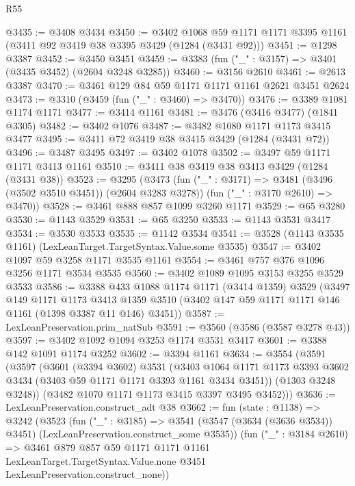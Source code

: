 \begin{lexlean}{R55}
\begin{coremodule}
@3435 := @3408 @3434
@3450 := @3402
    @1068
    @59
    @1171
    @1171
    @3395
    @1161
    (@3411 @92 @3419 @38 @3395 @3429 (@1284 (@3431 @92)))
@3451 := @1298 @3387
@3452 := @3450 @3451
@3459 := @3383 (fun ("_" : @3157) => @3401 (@3435 @3452) (@2604 @3248 @3285))
@3460 := @3156 @2610
@3461 := @2613 @3387
@3470 := @3461 @129 @84 @59 @1171 @1171 @1161 @2621 @3451 @2624
@3473 := @3310 (@3459 (fun ("_" : @3460) => @3470))
@3476 := @3389 @1081 @1174 @1171
@3477 := @3414 @1161
@3481 := @3476 (@3416 @3477) (@1841 @3305)
@3482 := @3402 @1076
@3487 := @3482 @1080 @1171 @1173 @3415 @3477
@3495 := @3411 @72 @3419 @38 @3415 @3429 (@1284 (@3431 @72))
@3496 := @3487 @3495
@3497 := @3402 @1078
@3502 := @3497 @59 @1171 @1171 @3413 @1161
@3510 := @3411 @38 @3419 @38 @3413 @3429 (@1284 (@3431 @38))
@3523 := @3295
    (@3473
      (fun ("_" : @3171) => @3481 (@3496 (@3502 @3510 @3451)) (@2604 @3283 @3278))
      (fun ("_" : @3170 @2610) => @3470))
@3528 := @3461 @888 @857 @1099 @3260 @1171
@3529 := @65 @3280
@3530 := @1143 @3529
@3531 := @65 @3250
@3533 := @1143 @3531 @3417
@3534 := @3530 @3533
@3535 := @1142 @3534
@3541 := @3528 (@1143 @3535 @1161) (LexLeanTarget.TargetSyntax.Value.some @3535)
@3547 := @3402 @1097 @59 @3258 @1171 @3535 @1161
@3554 := @3461 @757 @376 @1096 @3256 @1171 @3534 @3535
@3560 := @3402 @1089 @1095 @3153 @3255 @3529 @3533
@3586 := @3388
    @433
    @1088
    @1174
    @1171
    (@3414 @1359)
    @3529
    (@3497
      @149
      @1171
      @1173
      @3413
      @1359
      @3510
      (@3402 @147 @59 @1171 @1171 @146 @1161 (@1398 @3387 @11 @146) @3451))
@3587 := LexLeanPreservation.prim_natSub
@3591 := @3560 (@3586 (@3587 @3278 @43))
@3597 := @3402 @1092 @1094 @3253 @1174 @3531 @3417
@3601 := @3388 @142 @1091 @1174 @3252
@3602 := @3394 @1161
@3634 := @3554
    (@3591
      (@3597
        (@3601
          (@3394 @3602)
          @3531
          (@3403
            @1064
            @1171
            @1173
            @3393
            @3602
            @3434
            (@3403 @59 @1171 @1171 @3393 @1161 @3434 @3451))
          (@1303 @3248 @3248))
        (@3482 @1070 @1171 @1173 @3415 @3397 @3495 @3452)))
@3636 := LexLeanPreservation.construct_adt @38
@3662 := fun (state : @1138) =>
  @3242
    (@3523
      (fun ("_" : @3185) =>
      @3541 (@3547 (@3634 (@3636 @3534)) @3451) (LexLeanPreservation.construct_some @3535))
      (fun ("_" : @3184 @2610) =>
      @3461
        @879
        @857
        @59
        @1171
        @1171
        @1161
        LexLeanTarget.TargetSyntax.Value.none
        @3451
        LexLeanPreservation.construct_none))

\end{coremodule}
\end{lexlean}
